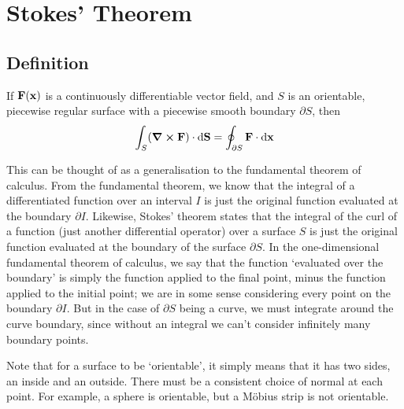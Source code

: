 \documentclass{article}
\begin{document}
\section{Stokes' Theorem}
\subsection{Definition}
\begin{proposition}
    If $\vb F(\vb x)$ is a continuously differentiable vector field, and $S$ is an orientable, piecewise regular surface with a piecewise smooth boundary $\partial S$, then
    \[ \int_S (\curl{\vb F}) \cdot \dd \vb S = \oint_{\partial S} \vb F\cdot \dd{\vb x} \]
\end{proposition}
\noindent This can be thought of as a generalisation to the fundamental theorem of calculus. From the fundamental theorem, we know that the integral of a differentiated function over an interval $I$ is just the original function evaluated at the boundary $\partial I$. Likewise, Stokes' theorem states that the integral of the curl of a function (just another differential operator) over a surface $S$ is just the original function evaluated at the boundary of the surface $\partial S$. In the one-dimensional fundamental theorem of calculus, we say that the function `evaluated over the boundary' is simply the function applied to the final point, minus the function applied to the initial point; we are in some sense considering every point on the boundary $\partial I$. But in the case of $\partial S$ being a curve, we must integrate around the curve boundary, since without an integral we can't consider infinitely many boundary points.

Note that for a surface to be `orientable', it simply means that it has two sides, an inside and an outside. There must be a consistent choice of normal at each point. For example, a sphere is orientable, but a M\"obius strip is not orientable.
\end{document}
